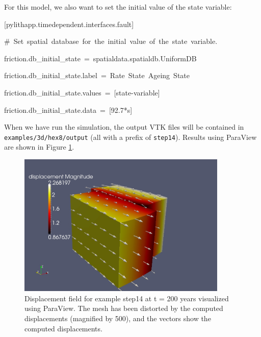 For this model, we also want to set the initial value of the state
variable:
\begin{lyxcode}
{[}pylithapp.timedependent.interfaces.fault{]}

\#~Set~spatial~database~for~the~initial~value~of~the~state~variable.

friction.db\_initial\_state~=~spatialdata.spatialdb.UniformDB

friction.db\_initial\_state.label~=~Rate~State~Ageing~State

friction.db\_initial\_state.values~=~{[}state-variable{]}

friction.db\_initial\_state.data~=~{[}92.7{*}s{]}
\end{lyxcode}
When we have run the simulation, the output VTK files will be contained
in \texttt{examples/3d/hex8/output} (all with a prefix of \texttt{step14}).
Results using ParaView are shown in Figure \ref{fig:step14-displ-t200}.

\begin{figure}
\begin{centering}
\includegraphics[width=10cm]{tutorials/3dhex8/figs/step14-displ-t200}
\par\end{centering}

\caption{Displacement field for example step14 at t = 200 years visualized
using ParaView. The mesh has been distorted by the computed displacements
(magnified by 500), and the vectors show the computed displacements.\label{fig:step14-displ-t200}}
\end{figure}

